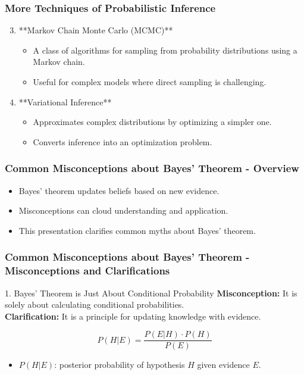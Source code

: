\documentclass[aspectratio=169]{beamer}
\begin{document}
\begin{frame}[fragile]
    \frametitle{More Techniques of Probabilistic Inference}
    \begin{enumerate}
        \setcounter{enumi}{2} %
        \item **Markov Chain Monte Carlo (MCMC)**
        \begin{itemize}
            \item A class of algorithms for sampling from probability distributions using a Markov chain.
            \item Useful for complex models where direct sampling is challenging.
        \end{itemize}

        \item **Variational Inference**
        \begin{itemize}
            \item Approximates complex distributions by optimizing a simpler one.
            \item Converts inference into an optimization problem.
        \end{itemize}
    \end{enumerate}
\end{frame}

\begin{frame}[fragile]
    \frametitle{Common Misconceptions about Bayes' Theorem - Overview}
    \begin{itemize}
        \item Bayes' theorem updates beliefs based on new evidence.
        \item Misconceptions can cloud understanding and application.
        \item This presentation clarifies common myths about Bayes' theorem.
    \end{itemize}
\end{frame}

\begin{frame}[fragile]
    \frametitle{Common Misconceptions about Bayes' Theorem - Misconceptions and Clarifications}

    \begin{block}{1. Bayes' Theorem is Just About Conditional Probability}
        \textbf{Misconception:} It is solely about calculating conditional probabilities.\\
        \textbf{Clarification:} It is a principle for updating knowledge with evidence.
    \end{block}
    
    \begin{equation}
        P(H|E) = \frac{P(E|H) \cdot P(H)}{P(E)}
    \end{equation}
    \begin{itemize}
        \item \(P(H|E)\): posterior probability of hypothesis \(H\) given evidence \(E\).
    \end{itemize}
\end{frame}
\end{document}
